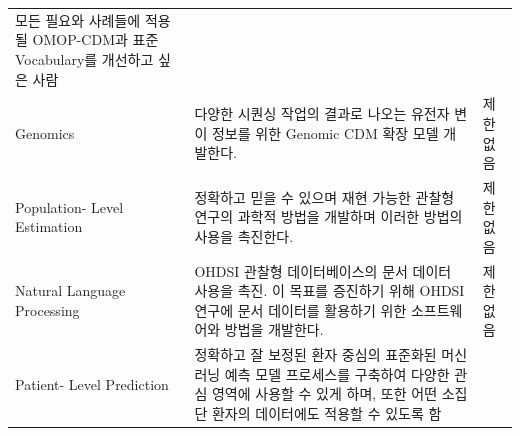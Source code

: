 \documentclass[11pt]{book}
\theoremstyle{definition}
\theoremstyle{definition}
\theoremstyle{definition}
\theoremstyle{remark}
\begin{document}
\begin{longtable}[]{@{}lll@{}}
\begin{minipage}[t]{0.37\columnwidth}
모든 필요와 사례들에 적용될 OMOP-CDM과 표준 Vocabulary를 개선하고 싶은
사람\strut
\end{minipage}\tabularnewline
\begin{minipage}[t]{0.11\columnwidth}\raggedright\strut
Genomics\strut
\end{minipage} & \begin{minipage}[t]{0.44\columnwidth}\raggedright\strut
다양한 시퀀싱 작업의 결과로 나오는 유전자 변이 정보를 위한 Genomic CDM
확장 모델 개발한다.\strut
\end{minipage} & \begin{minipage}[t]{0.37\columnwidth}\raggedright\strut
제한 없음\strut
\end{minipage}\tabularnewline
\begin{minipage}[t]{0.11\columnwidth}\raggedright\strut
Population- Level Estimation\strut
\end{minipage} & \begin{minipage}[t]{0.44\columnwidth}\raggedright\strut
정확하고 믿을 수 있으며 재현 가능한 관찰형 연구의 과학적 방법을 개발하며
이러한 방법의 사용을 촉진한다.\strut
\end{minipage} & \begin{minipage}[t]{0.37\columnwidth}\raggedright\strut
제한 없음\strut
\end{minipage}\tabularnewline
\begin{minipage}[t]{0.11\columnwidth}\raggedright\strut
Natural Language Processing\strut
\end{minipage} & \begin{minipage}[t]{0.44\columnwidth}\raggedright\strut
OHDSI 관찰형 데이터베이스의 문서 데이터 사용을 촉진. 이 목표를 증진하기
위해 OHDSI 연구에 문서 데이터를 활용하기 위한 소프트웨어와 방법을
개발한다.\strut
\end{minipage} & \begin{minipage}[t]{0.37\columnwidth}\raggedright\strut
제한 없음\strut
\end{minipage}\tabularnewline
\begin{minipage}[t]{0.11\columnwidth}\raggedright\strut
Patient- Level Prediction\strut
\end{minipage} & \begin{minipage}[t]{0.44\columnwidth}\raggedright\strut
정확하고 잘 보정된 환자 중심의 표준화된 머신러닝 예측 모델 프로세스를
구축하여 다양한 관심 영역에 사용할 수 있게 하며, 또한 어떤 소집단 환자의
데이터에도 적용할 수 있도록 함\strut
\end{minipage} & \begin{minipage}[t]{0.37\columnwidth}\raggedright\strut

\end{minipage}
\end{longtable}
\end{document}
